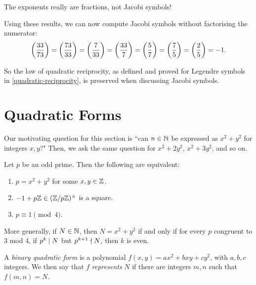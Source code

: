 \documentclass{article}
\begin{document}
\begin{note}
	The exponents really are fractions, not Jacobi symbols!
\end{note}

Using these results, we can now compute Jacobi symbols without factorising the numerator:
\[
\left( \frac{33}{73} \right) =
\left( \frac{73}{33} \right) =
\left( \frac{7}{33} \right) =
\left( \frac{33}{7} \right) =
\left( \frac{5}{7} \right) =
\left( \frac{7}{5} \right) =
\left( \frac{2}{5} \right) =
-1.
\]

So the law of quadratic reciprocity, as defined and proved for Legendre symbols in \ref{quadratic-reciprocity}, is preserved when discussing Jacobi symbols.


\pagebreak
\section{Quadratic Forms}
\label{subsection-quadratic-forms}

Our motivating question for this section is ``can $n \in \mathbb{N}$ be expressed as $x^2 + y^2$ for integers $x, y$?" Then, we ask the same question for $x^2 + 2y^2$, $x^2 + 3y^2$, and so on.

\begin{theorem}
	\label{fermat-euler-theorem}
    Let $p$ be an odd prime. Then the following are equivalent:
    \begin{enumerate}
    	\item $p = x^2 + y^2$ for some $x, y \in \mathbb{Z}$.
	    \item $-1 + p\mathbb{Z} \in (\mathbb{Z}/p\mathbb{Z})^\times$ is a square.
    	\item $p \equiv 1 \pmod{4}$.
	\end{enumerate}

	More generally, if $N \in \mathbb{N}$, then $N = x^2 + y^2$ if and only if for every $p$ congruent to 3 mod 4, if $p^k \mid N$ but $p^{k+1} \nmid N$, then $k$ is even.

\end{theorem}

\begin{definition}
	\label{binary-quadratic-form}
    A \textit{binary quadratic form} is a polynomial $f(x, y) = ax^2 + bxy + cy^2$, with $a,b,c$ integers. We then say that $f$ \textit{represents} $N$ if there are integers $m, n$ such that $f(m, n) = N$.
\end{definition}
\end{document}
